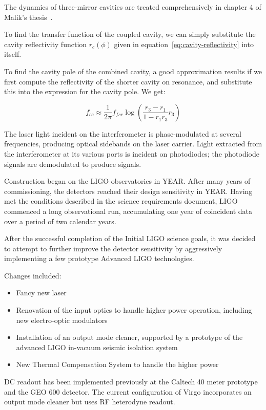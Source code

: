 The dynamics of three-mirror cavities are treated comprehensively in
chapter 4 of Malik's thesis~\cite{Rakhmanov2000Dynamics}.

To find the transfer function of the coupled cavity, we can simply
substitute the cavity reflectivity function $r_c(\phi)$ given in
equation~\ref{eq:cavity-reflectivity} into itself.  

To find the cavity pole of the combined cavity, a good approximation
results if we first compute the reflectivity of the shorter cavity on
resonance, and substitute this into the expression for the cavity pole.
We get:

\begin{equation}
f_{cc} \approx \frac{1}{2\pi} f_{fsr} \log \left(\frac{r_3 - r_1}{1 - r_1 r_3} r_3\right)
\end{equation}




The laser light incident on the interferometer is phase-modulated at
several frequencies, producing optical sidebands on the laser carrier.
Light extracted from the interferometer at its various ports is
incident on photodiodes; the photodiode signals are demodulated to
produce signals.


Construction began on the LIGO observatories in YEAR.  After many
years of commissioning, the detectors reached their design sensitivity
in YEAR.  Having met the conditions described in the science
requirements document, LIGO commenced a long observational run,
accumulating one year of coincident data over a period of two calendar
years.


After the successful completion of the Initial LIGO science goals, it
was decided
\cite{Adhikari2006Enhanced,T050252,JoshSmithEnhancedAdvanced} to
attempt to further improve the detector sensitivity by aggressively
implementing a few prototype Advanced LIGO technologies.

Changes included:
\begin{itemize}
\item Fancy new laser
\item Renovation of the input optics to handle higher power operation, including new electro-optic modulators \cite{Quetschke2008ElectroOptic}
\item Installation of an output mode cleaner, supported by a prototype of the advanced LIGO in-vacuum seismic isolation system
\item New Thermal Compensation System to handle the higher power
\end{itemize}

DC readout has been implemented previously at the Caltech 40 meter
prototype \cite{Ward2008DC,RobWardThesis} and the GEO 600
detector\cite{GeoDC,Prijatelj2010,Degallaix2010Commissioning}.  The
current configuration of Virgo incorporates an output mode cleaner but
uses RF heterodyne readout\cite{Acernese2008Virgo}.



